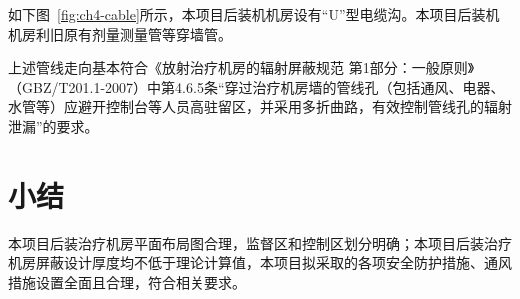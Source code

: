 如下图~\ref{fig:ch4-cable}所示，本项目后装机机房设有“U”型电缆沟。本项目后装机机房利旧原有剂量测量管等穿墙管。

上述管线走向基本符合《放射治疗机房的辐射屏蔽规范 第1部分：一般原则》（GBZ/T201.1-2007）中第4.6.5条“穿过治疗机房墙的管线孔（包括通风、电器、水管等）应避开控制台等人员高驻留区，并采用多折曲路，有效控制管线孔的辐射泄漏”的要求。






\section{小结}

本项目后装治疗机房平面布局图合理，监督区和控制区划分明确；本项目后装治疗机房屏蔽设计厚度均不低于理论计算值，本项目拟采取的各项安全防护措施、通风措施设置全面且合理，符合相关要求。
